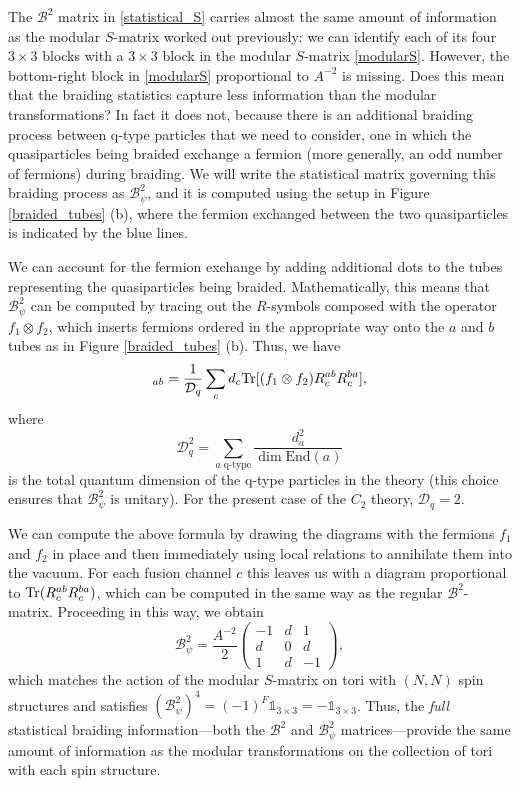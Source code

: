 \documentclass[12pt,a4paper]{article}
\newcommand{\tp}{\otimes}
\newcommand{\unit}{\mathds{1}}
\newcommand{\mcb}{\mathcal{B}}
\newcommand{\mcd}{\mathcal{D}}
\newcommand\be            {\begin{equation}}
\newcommand\ee            {\end{equation}}
\newcommand{\End}{\text{End}}
\begin{document}
The $\mcb^2$ matrix in \eqref{statistical_S} carries almost the same amount of information as the modular $S$-matrix worked out previously: we can identify each of its four $3\times3$ blocks with a $3\times3$ block in the modular $S$-matrix \eqref{modularS}. 
However, the bottom-right block in \eqref{modularS} proportional to $A^{-2}$ is missing. Does this mean that the braiding statistics capture less information than the modular transformations? 
In fact it does not, because there is an additional braiding process between q-type particles that we need to consider, one in which the quasiparticles being braided exchange a fermion (more generally, an odd number of fermions) during braiding. 
We will write the statistical matrix governing this braiding process as $\mcb^2_\psi$, and it is computed using the setup in Figure \ref{braided_tubes} (b), where the fermion exchanged between the two quasiparticles is indicated by the blue lines. 

We can account for the fermion exchange by adding additional dots to the tubes representing the quasiparticles being braided.
Mathematically, this means that $\mcb^2_\psi$ can be computed by tracing out the $R$-symbols composed with the operator $f_1\tp f_2$, which inserts fermions ordered in the appropriate way onto the $a$ and $b$ tubes as in Figure \ref{braided_tubes} (b). 
Thus, we have
\be [\mcb^2_\psi]_{ab} = \frac{1}{\mcd_{q}}\sum_cd_c{\rm Tr}[(f_1\tp f_2)R^{ab}_cR^{ba}_c], \ee
where 
\be \mcd^2_q = \sum_{a \text{\ q-type}}\frac{d_a^2}{\dim\End(a)}\ee
is the total quantum dimension of the q-type particles in the theory (this choice ensures that $\mcb^2_\psi$ is unitary). 
For the present case of the $C_2$ theory, $\mcd_q = 2$. 

We can compute the above formula by drawing the diagrams with the fermions $f_1$ and $f_2$ in place and then immediately using local relations to annihilate them into the vacuum.
For each fusion channel $c$ this leaves us with a diagram proportional to ${\rm Tr}(R^{ab}_cR^{ba}_c)$, which can be computed in the same way as the regular $\mcb^2$-matrix. 
Proceeding in this way, we obtain 
\be \mcb^2_\psi = \frac{A^{-2}}{2}\begin{pmatrix} -1 & d & 1 \\ d & 0 & d \\ 1 & d & -1\end{pmatrix},\ee
which matches the action of the modular $S$-matrix on tori with $(N,N)$ spin structures and satisfies $(\mcb^2_\psi)^4=(-1)^F\unit_{3\times3}=-\unit_{3\times3}$. 
Thus, the {\it full} statistical braiding information---both the $\mcb^2$ and $\mcb^2_\psi$ matrices---provide the same amount of information as the modular transformations on the collection of tori with each spin structure. 
\end{document}
